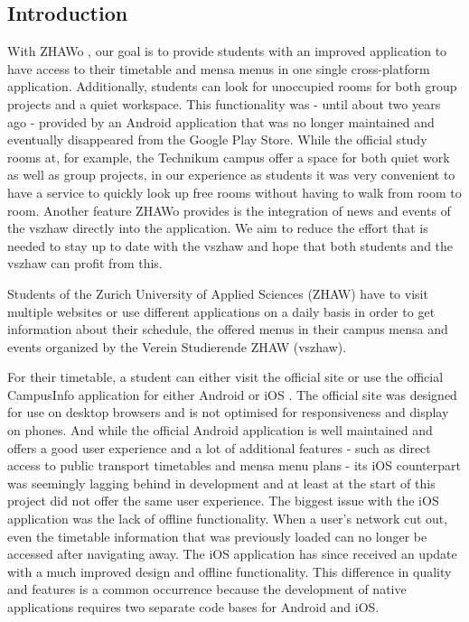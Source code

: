\begin{markdown}
\section{Introduction} \label{introduction}

With ZHAWo \cite{OurHost}, our goal is to provide students with an improved application to have access to their timetable and mensa menus in one single cross-platform application. Additionally, students can look for unoccupied rooms for both group projects and a quiet workspace. This functionality was - until about two years ago - provided by an Android application that was no longer maintained and eventually disappeared from the Google Play Store. While the official study rooms at, for example, the Technikum campus offer a space for both quiet work as well as group projects, in our experience as students it was very convenient to have a service to quickly look up free rooms without having to walk from room to room. Another feature ZHAWo provides is the integration of news \cite{VszhawNews} and events \cite{VszhawCalendar} of the vszhaw directly into the application. We aim to reduce the effort that is needed to stay up to date with the vszhaw and hope that both students and the vszhaw can profit from this.

Students of the Zurich University of Applied Sciences (ZHAW) have to visit multiple websites or use different applications on a daily basis in order to get information about their schedule, the offered menus in their campus mensa and events organized by the Verein Studierende ZHAW (vszhaw).

For their timetable, a student can either visit the official site \cite{Stundenplan} or use the official CampusInfo application for either Android \cite{AppAndroid} or iOS \cite{AppIOS}. The official site was designed for use on desktop browsers and is not optimised for responsiveness and display on phones. And while the official Android application is well maintained and offers a good user experience and a lot of additional features - such as direct access to public transport timetables and mensa menu plans - its iOS counterpart was seemingly lagging behind in development and at least at the start of this project did not offer the same user experience. The biggest issue with the iOS application was the lack of offline functionality. When a user's network cut out, even the timetable information that was previously loaded can no longer be accessed after navigating away. The iOS application has since received an update with a much improved design and offline functionality. This difference in quality and features is a common occurrence because the development of native applications requires two separate code bases for Android and iOS. 


\end{markdown}
